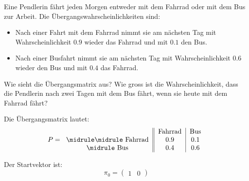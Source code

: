 \begin{myexercise}[Pendlerverhalten]
    Eine Pendlerin fährt jeden Morgen entweder mit dem Fahrrad oder mit dem Bus zur Arbeit. Die Übergangswahrscheinlichkeiten sind:
    \begin{itemize}
        \item Nach einer Fahrt mit dem Fahrrad nimmt sie am nächsten Tag mit Wahrscheinlichkeit $0.9$ wieder das Fahrrad und mit $0.1$ den Bus.
        \item Nach einer Busfahrt nimmt sie am nächsten Tag mit Wahrscheinlichkeit $0.6$ wieder den Bus und mit $0.4$ das Fahrrad.
    \end{itemize}
    Wie sieht die Übergangsmatrix aus? Wie gross ist die Wahrscheinlichkeit, dass die Pendlerin nach zwei Tagen mit dem Bus fährt, wenn sie heute mit dem Fahrrad fährt?
    \begin{myanswer}
        Die Übergangsmatrix lautet:
        \[
            P =
            \begin{tabular}{c||c|c}
                        & Fahrrad & Bus \\
                \midrule\midrule
                Fahrrad & 0.9     & 0.1 \\
                \midrule
                Bus     & 0.4     & 0.6 \\
            \end{tabular}
        \]

        Der Startvektor ist:
        \[
            \pi_0 =
            \begin{pmatrix}
                1 & 0
            \end{pmatrix}
        \]


\end{myanswer}
\end{myexercise}
